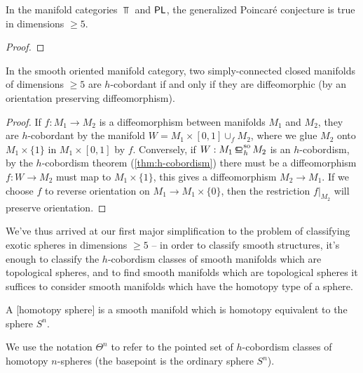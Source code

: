 \begin{theorem}
	In the manifold categories $\Top$ and $\mathsf{PL}$, the generalized Poincar\'e conjecture is true in dimensions $\geq 5$.
\end{theorem}
\begin{proof}
\end{proof}


\begin{corollary}\label{thm:h-cobordism-diffeomorphism}
	In the smooth oriented manifold category, two simply-connected closed manifolds of dimensions $\geq 5$ are $h$-cobordant if and only if they are diffeomorphic (by an orientation preserving diffeomorphism).
\end{corollary}
\begin{proof}
	If $f : M_1 \to M_2$ is a diffeomorphism between manifolds $M_1$ and $M_2$, they are $h$-cobordant by the manifold $W=M_1\times [0,1]\cup_f M_2$, where we glue $M_2$ onto $M_1\times \{1\}$ in $M_1\times [0,1]$ by $f$.
	Conversely, if $W : M_1\sohbord M_2$ is an $h$-cobordism, by the $h$-cobordism theorem (\ref{thm:h-cobordism}) there must be a diffeomorphism $f : W \to M_2$ must map to $M_1\times \{1\}$, this gives a diffeomorphism $M_2 \to M_1$. If we choose $f$ to reverse orientation on $M_1\to M_1\times \{0\}$, then the restriction $f|_{M_2}$ will preserve orientation.
\end{proof}

We've thus arrived at our first major simplification to the problem of classifying exotic spheres in dimensions $\geq 5$ -- in order to classify smooth structures, it's enough to classify the $h$-cobordism classes of smooth manifolds which are topological spheres, and to find smooth manifolds which are topological spheres it suffices to consider smooth manifolds which have the homotopy type of a sphere.

\begin{definition}
	A [homotopy sphere] is a smooth manifold which is homotopy equivalent to the sphere $S^n$.
\end{definition}

\begin{definition}
	We use the notation $\Theta^n$ to refer to the pointed set of $h$-cobordism classes of homotopy $n$-spheres (the basepoint is the ordinary sphere $S^n$).
\end{definition}

